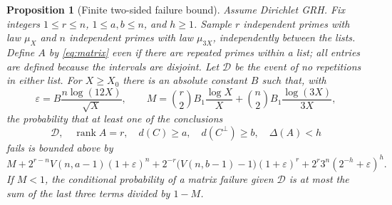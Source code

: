 \documentclass[11pt]{article}
\newtheorem{proposition}[theorem]{Proposition}
\theoremstyle{remark}\newtheorem{remark}[theorem]{Remark}
\newcommand{\rank}{\operatorname{rank}}
\newcommand{\eps}{\varepsilon}
\begin{document}
\begin{proposition}[Finite two-sided failure bound]\label{prop:finite}
Assume Dirichlet GRH. Fix integers $1\le r\le n$, $1\le a,b\le n$, and $h\ge1$. Sample $r$ independent primes with law $\mu_X$ and $n$ independent primes with law $\mu_{3X}$, independently between the lists. Define $A$ by \eqref{eq:matrix} even if there are repeated primes within a list; all entries are defined because the intervals are disjoint. Let $\mathcal D$ be the event of no repetitions in either list. For $X\ge X_0$ there is an absolute constant $B$ such that, with
\[
 \eps=B\frac{n\log(12X)}{\sqrt X},
 \qquad M=\binom r2 B_1\frac{\log X}{X}+\binom n2 B_1\frac{\log(3X)}{3X},
\]
the probability that at least one of the conclusions
\[
 \mathcal D,\quad \rank A=r,\quad d(C)\ge a,\quad d(C^\perp)\ge b,\quad\Delta(A)<h
\]
fails is bounded above by
\begin{equation}\label{eq:failure}
 M+2^{r-n}V(n,a-1)(1+\eps)^n
 +2^{-r}\bigl(V(n,b-1)-1\bigr)(1+\eps)^r
 +2^r3^n(2^{-h}+\eps)^h.
\end{equation}
If $M<1$, the conditional probability of a matrix failure given $\mathcal D$ is at most the sum of the last three terms divided by $1-M$.
\end{proposition}
\end{document}
